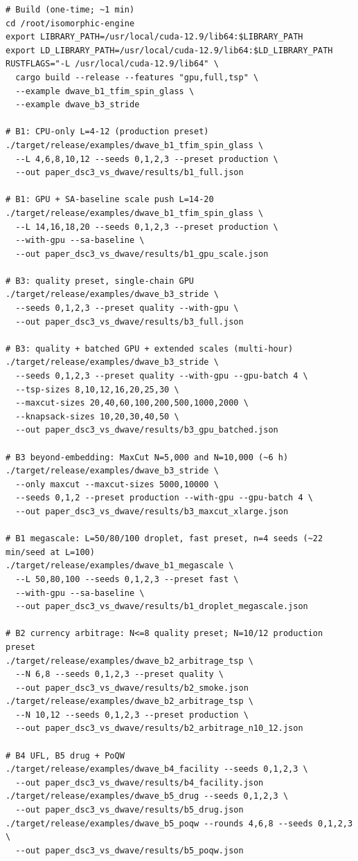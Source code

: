\documentclass[11pt,a4paper]{article}
\begin{document}
\begin{lstlisting}
# Build (one-time; ~1 min)
cd /root/isomorphic-engine
export LIBRARY_PATH=/usr/local/cuda-12.9/lib64:$LIBRARY_PATH
export LD_LIBRARY_PATH=/usr/local/cuda-12.9/lib64:$LD_LIBRARY_PATH
RUSTFLAGS="-L /usr/local/cuda-12.9/lib64" \
  cargo build --release --features "gpu,full,tsp" \
  --example dwave_b1_tfim_spin_glass \
  --example dwave_b3_stride

# B1: CPU-only L=4-12 (production preset)
./target/release/examples/dwave_b1_tfim_spin_glass \
  --L 4,6,8,10,12 --seeds 0,1,2,3 --preset production \
  --out paper_dsc3_vs_dwave/results/b1_full.json

# B1: GPU + SA-baseline scale push L=14-20
./target/release/examples/dwave_b1_tfim_spin_glass \
  --L 14,16,18,20 --seeds 0,1,2,3 --preset production \
  --with-gpu --sa-baseline \
  --out paper_dsc3_vs_dwave/results/b1_gpu_scale.json

# B3: quality preset, single-chain GPU
./target/release/examples/dwave_b3_stride \
  --seeds 0,1,2,3 --preset quality --with-gpu \
  --out paper_dsc3_vs_dwave/results/b3_full.json

# B3: quality + batched GPU + extended scales (multi-hour)
./target/release/examples/dwave_b3_stride \
  --seeds 0,1,2,3 --preset quality --with-gpu --gpu-batch 4 \
  --tsp-sizes 8,10,12,16,20,25,30 \
  --maxcut-sizes 20,40,60,100,200,500,1000,2000 \
  --knapsack-sizes 10,20,30,40,50 \
  --out paper_dsc3_vs_dwave/results/b3_gpu_batched.json

# B3 beyond-embedding: MaxCut N=5,000 and N=10,000 (~6 h)
./target/release/examples/dwave_b3_stride \
  --only maxcut --maxcut-sizes 5000,10000 \
  --seeds 0,1,2 --preset production --with-gpu --gpu-batch 4 \
  --out paper_dsc3_vs_dwave/results/b3_maxcut_xlarge.json

# B1 megascale: L=50/80/100 droplet, fast preset, n=4 seeds (~22 min/seed at L=100)
./target/release/examples/dwave_b1_megascale \
  --L 50,80,100 --seeds 0,1,2,3 --preset fast \
  --with-gpu --sa-baseline \
  --out paper_dsc3_vs_dwave/results/b1_droplet_megascale.json

# B2 currency arbitrage: N<=8 quality preset; N=10/12 production preset
./target/release/examples/dwave_b2_arbitrage_tsp \
  --N 6,8 --seeds 0,1,2,3 --preset quality \
  --out paper_dsc3_vs_dwave/results/b2_smoke.json
./target/release/examples/dwave_b2_arbitrage_tsp \
  --N 10,12 --seeds 0,1,2,3 --preset production \
  --out paper_dsc3_vs_dwave/results/b2_arbitrage_n10_12.json

# B4 UFL, B5 drug + PoQW
./target/release/examples/dwave_b4_facility --seeds 0,1,2,3 \
  --out paper_dsc3_vs_dwave/results/b4_facility.json
./target/release/examples/dwave_b5_drug --seeds 0,1,2,3 \
  --out paper_dsc3_vs_dwave/results/b5_drug.json
./target/release/examples/dwave_b5_poqw --rounds 4,6,8 --seeds 0,1,2,3 \
  --out paper_dsc3_vs_dwave/results/b5_poqw.json
\end{lstlisting}
\end{document}

